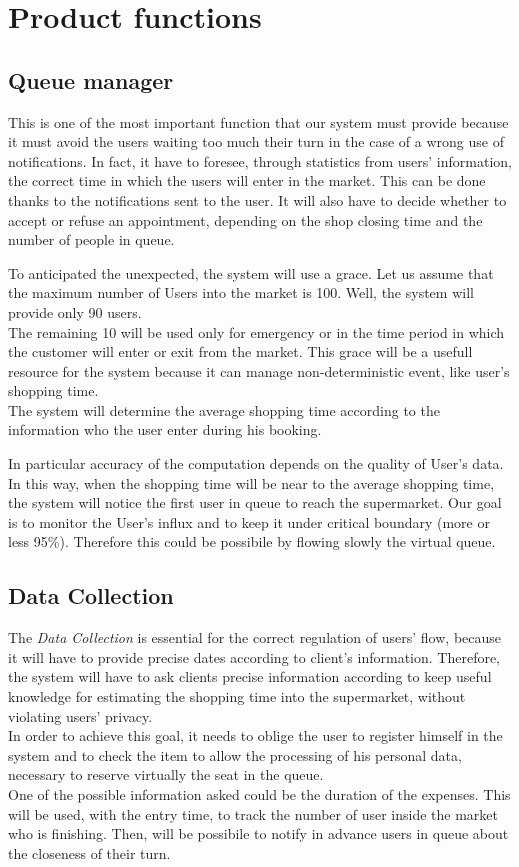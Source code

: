 \section{Product functions}
\subsection{Queue manager}
This is one of the most important function that our system must provide because it must avoid the users waiting too much their turn in the case of a wrong use of notifications. 
In fact, it have to foresee, through statistics from users’ information, the correct time in which the users will enter in the market. This can be done thanks to the notifications sent to the user.
It will also have to decide whether to accept or refuse an appointment, depending on the shop closing time and the number of people in queue. 



To anticipated the unexpected, the system will use a grace.
Let us assume that the maximum number of Users into the market is 100. Well, the system will provide only 90 users.
\\
The remaining 10 will be used only for emergency or in the time period in which the customer will enter or exit from the market.
This grace will be a usefull resource for the system because it can manage non-deterministic event, like user's shopping time.
\\%
The system will determine the average shopping time according to the information who the user enter during his booking.
\par
In particular accuracy of the computation depends on the quality of User's data.
In this way, when the shopping time will be near to the average shopping time, the system will notice the first user in queue to reach the supermarket.  
Our goal is to monitor the User's influx and to keep it under critical boundary (more or less 95\%). Therefore this could be possibile by flowing slowly the virtual queue.
\par
\subsection{Data Collection}
The \textit{Data Collection} is essential for the correct regulation of users' flow, because it will have to provide precise dates according to client’s information. 
Therefore, the system will have to ask clients precise information according to keep useful knowledge for estimating the shopping time into the supermarket, without violating users’ privacy. 
\\
In order to achieve this goal, it needs to oblige the user to register himself in the system and to check the item to allow the processing of his personal data, necessary to reserve virtually the seat in the queue.
\\
One of the possible information asked could be the duration of the expenses. This will be used, with the entry time, to track the number of user inside the market who is finishing. Then, will be possibile to notify in advance users in queue about the closeness of their turn.

